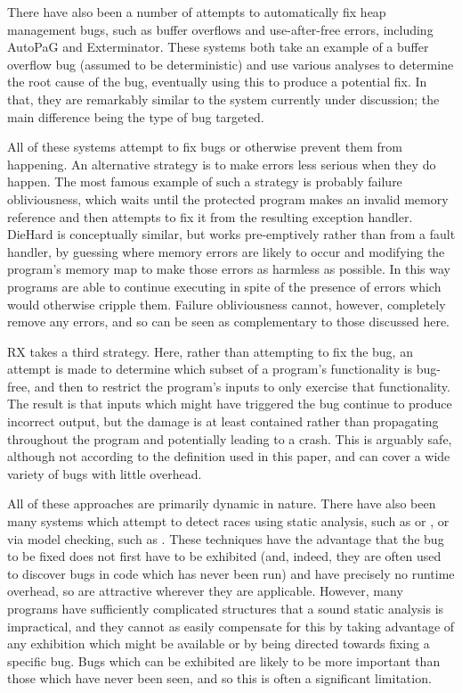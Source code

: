 \documentclass[10pt,twocolumn,preprint,natbib,authoryear]{sigplanconf}
\newcommand{\editorial}[1]{}
\begin{document}
There have also been a number of attempts to automatically fix heap
management bugs, such as buffer overflows and use-after-free errors,
including AutoPaG\cite{Lin2007} and Exterminator\cite{Novark2007}.
These systems both take an example of a buffer overflow bug (assumed
to be deterministic) and use various analyses to determine the root
cause of the bug, eventually using this to produce a potential fix.
In that, they are remarkably similar to the system currently under
discussion; the main difference being the type of bug targeted.

All of these systems attempt to fix bugs or otherwise prevent them
from happening.  An alternative strategy is to make errors less
serious when they do happen.  The most famous example of such a
strategy is probably failure obliviousness\cite{Rinard2004}, which
waits until the protected program makes an invalid memory reference
and then attempts to fix it from the resulting exception handler.
DieHard\cite{Berger2006} is conceptually similar, but works
pre-emptively rather than from a fault handler, by guessing where
memory errors are likely to occur and modifying the program's memory
map to make those errors as harmless as possible.  In this way
programs are able to continue executing in spite of the presence of
errors which would otherwise cripple them.  Failure obliviousness
cannot, however, completely remove any errors, and so can be seen as
complementary to those discussed here.

RX\cite{Qin2007} takes a third strategy.  Here, rather than
attempting to fix the bug, an attempt is made to determine which
subset of a program's functionality is bug-free, and then to restrict
the program's inputs to only exercise that functionality.  The result
is that inputs which might have triggered the bug continue to produce
incorrect output, but the damage is at least contained rather than
propagating throughout the program and potentially leading to a crash.
This is arguably safe, although not according to the definition used
in this paper, and can cover a wide variety of bugs with little
overhead.

All of these approaches are primarily dynamic in nature.  There have
also been many systems which attempt to detect races using static
analysis, such as \cite{Pratikakis2006} or \cite{Engler2003}, or via
model checking, such as \cite{Elmas06preciserace}.  These techniques
have the advantage that the bug to be fixed does not first have to be
exhibited (and, indeed, they are often used to discover bugs in code
which has never been run) and have precisely no runtime overhead, so
are attractive wherever they are applicable.  However, many programs
have sufficiently complicated structures that a sound static analysis
is impractical, and they cannot as easily compensate for this by
taking advantage of any exhibition which might be available or by
being directed towards fixing a specific bug.  Bugs which can be
exhibited are likely to be more important than those which have never
been seen, and so this is often a significant
limitation. \editorial{...}
\end{document}

